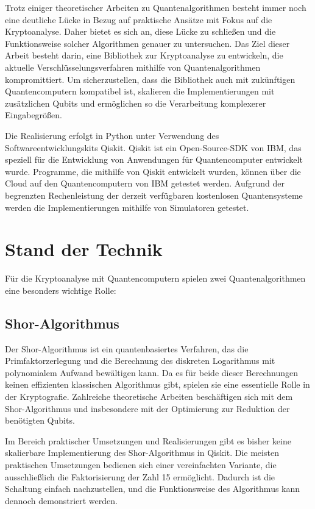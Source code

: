 \documentclass[
	a4paper, %
	10pt, %
	unnumberedsections, %
	twoside, %
]{LTJournalArticle}
\begin{document}
Trotz einiger theoretischer Arbeiten zu Quantenalgorithmen besteht immer noch eine deutliche Lücke in Bezug auf praktische Ansätze mit Fokus auf die Kryptoanalyse. Daher bietet es sich an, diese Lücke zu schließen und die Funktionsweise solcher Algorithmen genauer zu untersuchen. Das Ziel dieser Arbeit besteht darin, eine Bibliothek zur Kryptoanalyse zu entwickeln, die aktuelle Verschlüsselungsverfahren mithilfe von Quantenalgorithmen kompromittiert. Um sicherzustellen, dass die Bibliothek auch mit zukünftigen Quantencomputern kompatibel ist, skalieren die Implementierungen mit zusätzlichen Qubits und ermöglichen so die Verarbeitung komplexerer Eingabegrößen.

Die Realisierung erfolgt in Python unter Verwendung des Softwareentwicklungskits Qiskit. Qiskit ist ein Open-Source-SDK von IBM, das speziell für die Entwicklung von Anwendungen für Quantencomputer entwickelt wurde. Programme, die mithilfe von Qiskit entwickelt wurden, können über die Cloud auf den Quantencomputern von IBM getestet werden. Aufgrund der begrenzten Rechenleistung der derzeit verfügbaren kostenlosen Quantensysteme werden die Implementierungen mithilfe von Simulatoren getestet.



\section{Stand der Technik}

Für die Kryptoanalyse mit Quantencomputern spielen zwei Quantenalgorithmen eine besonders wichtige Rolle:

\subsection{Shor-Algorithmus}
Der Shor-Algorithmus ist ein quantenbasiertes Verfahren, das die Primfaktorzerlegung und die Berechnung des diskreten Logarithmus mit polynomialem Aufwand bewältigen kann. Da es für beide dieser Berechnungen keinen effizienten klassischen Algorithmus gibt, spielen sie eine essentielle Rolle in der Kryptografie\autocite{Shor:1997}. Zahlreiche theoretische Arbeiten beschäftigen sich mit dem Shor-Algorithmus und insbesondere mit der Optimierung zur Reduktion der benötigten Qubits.

Im Bereich praktischer Umsetzungen und Realisierungen gibt es bisher keine skalierbare Implementierung des Shor-Algorithmus in Qiskit. Die meisten praktischen Umsetzungen bedienen sich einer vereinfachten Variante, die ausschließlich die Faktorisierung der Zahl 15 ermöglicht. Dadurch ist die Schaltung einfach nachzustellen, und die Funktionsweise des Algorithmus kann dennoch demonstriert werden\autocite{9376169, Monz_2016, IBM:Shor}.
\end{document}
